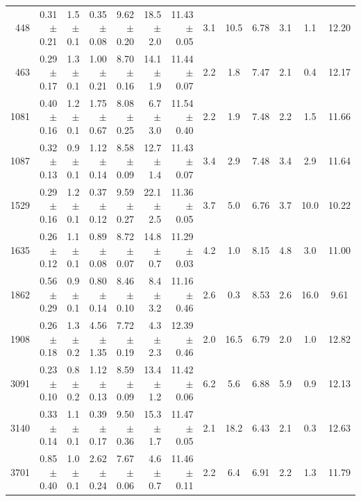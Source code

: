 \begin{table}
{\begin{tabular}{|r |r |r |r r |r r |c c c |c c c|}
%
\hline
%
  448 & 0.31 $\pm$ 0.21 & 1.5 $\pm$ 0.1 &  0.35 $\pm$ 0.08 & 9.62 $\pm$ 0.20 & 18.5 $\pm$ 2.0 & 11.43 $\pm$ 0.05 & 3.1 & 10.5 & 6.78 & 3.1 &  1.1 & 12.20 \\
  463 & 0.29 $\pm$ 0.17 & 1.3 $\pm$ 0.1 &  1.00 $\pm$ 0.21 & 8.70 $\pm$ 0.16 & 14.1 $\pm$ 1.9 & 11.44 $\pm$ 0.07 & 2.2 &  1.8 & 7.47 & 2.1 &  0.4 & 12.17 \\
 1081 & 0.40 $\pm$ 0.16 & 1.2 $\pm$ 0.1 &  1.75 $\pm$ 0.67 & 8.08 $\pm$ 0.25 &  6.7 $\pm$ 3.0 & 11.54 $\pm$ 0.40 & 2.2 &  1.9 & 7.48 & 2.2 &  1.5 & 11.66 \\
 1087 & 0.32 $\pm$ 0.13 & 0.9 $\pm$ 0.1 &  1.12 $\pm$ 0.14 & 8.58 $\pm$ 0.09 & 12.7 $\pm$ 1.4 & 11.43 $\pm$ 0.07 & 3.4 &  2.9 & 7.48 & 3.4 &  2.9 & 11.64 \\
 1529 & 0.29 $\pm$ 0.16 & 1.2 $\pm$ 0.1 &  0.37 $\pm$ 0.12 & 9.59 $\pm$ 0.27 & 22.1 $\pm$ 2.5 & 11.36 $\pm$ 0.05 & 3.7 &  5.0 & 6.76 & 3.7 & 10.0 & 10.22 \\
 1635 & 0.26 $\pm$ 0.12 & 1.1 $\pm$ 0.1 &  0.89 $\pm$ 0.08 & 8.72 $\pm$ 0.07 & 14.8 $\pm$ 0.7 & 11.29 $\pm$ 0.03 & 4.2 &  1.0 & 8.15 & 4.8 &  3.0 & 11.00 \\
 1862 & 0.56 $\pm$ 0.29 & 0.9 $\pm$ 0.1 &  0.80 $\pm$ 0.14 & 8.46 $\pm$ 0.10 &  8.4 $\pm$ 3.2 & 11.16 $\pm$ 0.46 & 2.6 &  0.3 & 8.53 & 2.6 & 16.0 &  9.61 \\
 1908 & 0.26 $\pm$ 0.18 & 1.3 $\pm$ 0.2 &  4.56 $\pm$ 1.35 & 7.72 $\pm$ 0.19 &  4.3 $\pm$ 2.3 & 12.39 $\pm$ 0.46 & 2.0 & 16.5 & 6.79 & 2.0 &  1.0 & 12.82 \\
 3091 & 0.23 $\pm$ 0.10 & 0.8 $\pm$ 0.2 &  1.12 $\pm$ 0.13 & 8.59 $\pm$ 0.09 & 13.4 $\pm$ 1.2 & 11.42 $\pm$ 0.06 & 6.2 &  5.6 & 6.88 & 5.9 &  0.9 & 12.13 \\
 3140 & 0.33 $\pm$ 0.14 & 1.1 $\pm$ 0.1 &  0.39 $\pm$ 0.17 & 9.50 $\pm$ 0.36 & 15.3 $\pm$ 1.7 & 11.47 $\pm$ 0.05 & 2.1 & 18.2 & 6.43 & 2.1 &  0.3 & 12.63 \\
 3701 & 0.85 $\pm$ 0.40 & 1.0 $\pm$ 0.1 &  2.62 $\pm$ 0.24 & 7.67 $\pm$ 0.06 &  4.6 $\pm$ 0.7 & 11.46 $\pm$ 0.11 & 2.2 &  6.4 & 6.91 & 2.2 &  1.3 & 11.79 \\

\end{tabular}}
\end{table}
